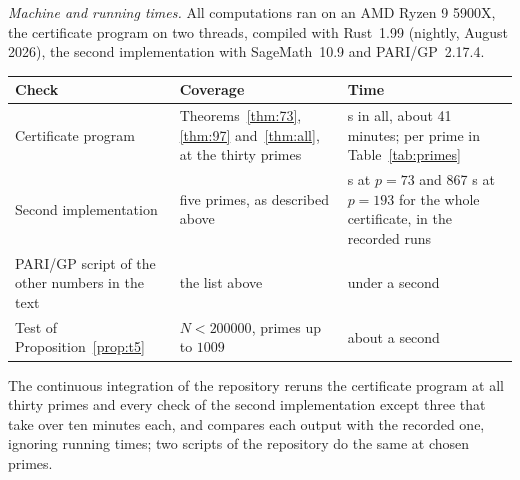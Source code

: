 \documentclass[12pt]{amsart}
\theoremstyle{definition}
\begin{document}
\emph{Machine and running times.} All computations ran on an AMD Ryzen 9 5900X, the certificate program on two threads, compiled with Rust~1.99 (nightly, August 2026), the second implementation with SageMath~10.9 and PARI/GP~2.17.4.
\begin{center}
\small
\renewcommand{\arraystretch}{1.2}
\begin{tabular}{>{\raggedright\arraybackslash}p{} >{\raggedright\arraybackslash}p{} >{\raggedright\arraybackslash}p{}}
\hline
Check & Coverage & Time\\
\hline
Certificate program & Theorems~\ref{thm:73}, \ref{thm:97} and~\ref{thm:all}, at the thirty primes & 2486 s in all, about 41 minutes; per prime in Table~\ref{tab:primes}\\
Second implementation & five primes, as described above & 108 s at $p=73$ and 867 s at $p=193$ for the whole certificate, in the recorded runs\\
PARI/GP script of the other numbers in the text & the list above & under a second\\
Test of Proposition~\ref{prop:t5} & $N<200000$, primes up to $1009$ & about a second\\
\hline
\end{tabular}
\end{center}
The continuous integration of the repository reruns the certificate program at all thirty primes and every check of the second implementation except three that take over ten minutes each, and compares each output with the recorded one, ignoring running times; two scripts of the repository do the same at chosen primes.
\end{document}
